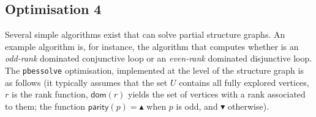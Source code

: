 \documentclass{article}
\newcommand{\up}{\blacktriangle}
\newcommand{\down}{\blacktriangledown}
\newcommand{\If}{\text{\textbf{if }}}
\newcommand{\Then}{\text{\textbf{ then }}}
\newcommand{\Return}{\text{\textbf{return }}}
\begin{document}
\subsection{Optimisation 4}
Several simple algorithms exist that can solve partial structure graphs. An example
algorithm is, for instance, the algorithm that computes whether is an
\emph{odd-rank} dominated conjunctive loop or an \emph{even-rank} dominated disjunctive loop.
The \texttt{pbessolve} optimisation, implemented at the level of the structure graph is as
follows (it typically assumes that the set $U$ contains all fully explored vertices, $r$ is
the rank function, $\textsf{dom}(r)$ yields the set of vertices with a rank associated to
them; the function $\mathsf{parity}(p) = \up$ when $p$ is odd, and $\down$ otherwise).
\end{document}
